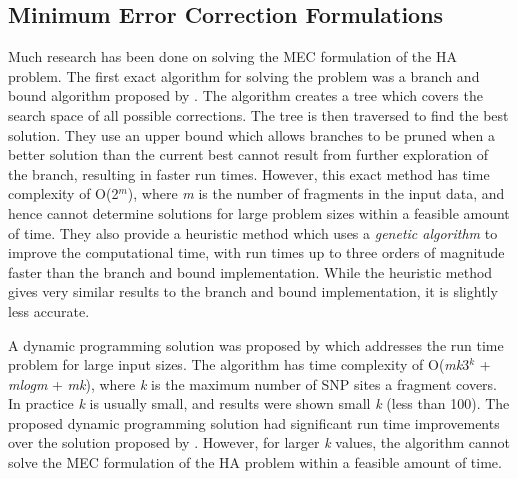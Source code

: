 \documentclass[10pt,twocolumn]{article}
\newcommand{\K}{\textit{k }}
\newcommand{\M}{\textit{m }}
\begin{document}
\subsection{Minimum Error Correction Formulations} \label{sec:mecimp}

Much research has been done on solving the MEC formulation of the HA problem. The first exact algorithm for
solving the problem was a branch and bound algorithm proposed by \cite{wang:2005}. The algorithm creates a
tree which covers the search space of all possible corrections. The tree is then traversed to find the best
solution. They use an upper bound which allows branches to be pruned when a better solution than the current 
best cannot result from further exploration of the branch, resulting in faster run times. However, this exact 
method has time complexity of O(2$^{\textit{m}}$), where \M is the number of fragments in the input data, and 
hence cannot determine solutions for large problem sizes within a feasible amount of time. They also 
provide a heuristic method which uses a \textit{genetic algorithm} to improve the computational time, with
run times up to three orders of magnitude faster than the branch and bound implementation. While the heuristic
method gives very similar results to the branch and bound implementation, it is slightly less accurate. 

A dynamic programming solution was proposed by \cite{xie:2008} which addresses the run time problem for large
input sizes. The algorithm has time complexity of O(\textit{mk}3$^{\textit{k}}$ + \textit{mlogm} +
\textit{mk}), where \K is the maximum number of SNP sites a fragment covers. In practice \K is usually small,
and results were shown small \K (less than 100). The proposed dynamic programming solution had significant run
time improvements over the solution proposed by \cite{wang:2005}. However, for larger \K values, the 
algorithm cannot solve the MEC formulation of the HA problem within a feasible amount of time. 
\end{document}

